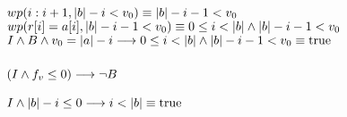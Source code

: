 \documentclass{article}
\begin{document}
$wp(i:i+1, |b|-i<v_{0}) \equiv |b|-i-1<v_{0}$\\

$wp(r[i] = a[i], |b|-i-1<v_{0}) \equiv 0 \leq i < |b| \wedge |b|-i-1<v_{0}$\\

$I \wedge B \wedge v_{0} = |a|-i \longrightarrow 0 \leq i < |b| \wedge |b|-i-1<v_{0} \equiv \mathrm{true}$

\subsubsection*{$(I \wedge f_{v} \leq 0) \longrightarrow \neg B$}

$I \wedge |b|-i \leq 0 \longrightarrow i < |b| \equiv \mathrm{true}$
\end{document}
